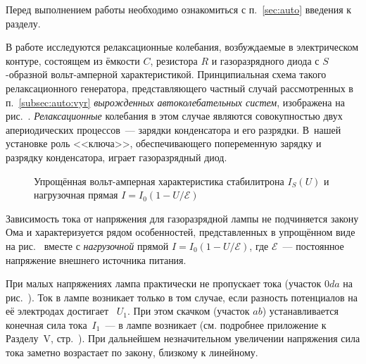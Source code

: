 


Перед выполнением работы необходимо ознакомиться с п.~\ref{sec:auto} 
введения к разделу.

В работе исследуются релаксационные колебания, возбуждаемые в электрическом
контуре, состоящем из ёмкости $C$, резистора $R$ и газоразрядного диода 
с $S$-образной вольт-амперной характеристикой. 
Принципиальная схема такого релаксационного генератора, представляющего 
частный случай рассмотренных в п.~\ref{subsec:auto:vyr}
\emph{вырожденных автоколебательных систем},
изображена на рис.~. \emph{Релаксационные} колебания в этом
случае являются совокупностью двух апериодических процессов~--- зарядки 
конденсатора и его разрядки. В~нашей установке роль <<ключа>>, обеспечивающего
попеременную зарядку и разрядку конденсатора, играет газоразрядный диод.

\begin{figure}[h!]
    \centering
    \caption{Упрощённая вольт-амперная характеристика стабилитрона $I_S(U)$
        и нагрузочная прямая $I=I_0(1-U/\mathcal{E})$}
\end{figure}

Зависимость тока от напряжения для газоразрядной лампы не подчиняется
закону Ома и характеризуется рядом особенностей, представленных
в упрощённом виде на рис.~ вместе с \emph{нагрузочной} прямой
$I=I_0 (1-U/\mathcal{E})$, где $\mathcal{E}$~--- постоянное напряжение 
внешнего источника питания.



При малых напряжениях лампа практически не пропускает тока 
(участок $0da$ на рис.~).
Ток в лампе возникает только в том случае, если разность потенциалов на её
электродах достигает ~$U_1$. 
При этом скачком (участок $ab$) устанавливается конечная 
сила тока~$I_1$~--- в лампе возникает
 (см. подробнее приложение к Разделу~V,
стр.~\pageref{sec:discharge}). 
При дальнейшем незначительном увеличении напряжения сила тока заметно возрастает 
по закону, близкому к линейному. 

